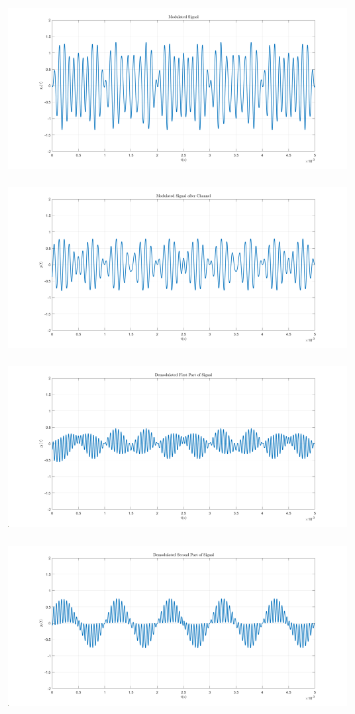 \documentclass[a4paper]{article}
\begin{document}
	\begin{figure}[H]
		\includegraphics[width=0.8\textwidth]{comsys_fig39.png}\\ 
		\centering
	\end{figure}
	\begin{figure}[H]
		\includegraphics[width=0.8\textwidth]{comsys_fig40.png}\\ 
		\centering
	\end{figure}
	\begin{figure}[H]
		\includegraphics[width=0.8\textwidth]{comsys_fig41.png}\\ 
		\centering
	\end{figure}
	\begin{figure}[H]
		\includegraphics[width=0.8\textwidth]{comsys_fig42.png}\\ 
		\centering
	\end{figure}
\end{document}
